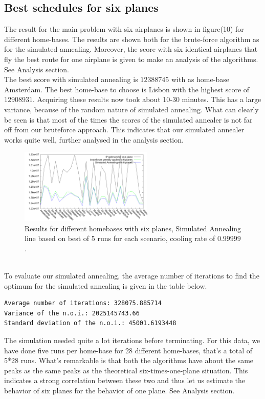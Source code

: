 \documentclass[journal]{IEEEtran}
\begin{document}
\subsection{Best schedules for six planes}
The result for the main problem with six airplanes is shown in figure(10) for different home-bases. The results are shown both for the brute-force algorithm as for the simulated annealing. Moreover, the score with six identical airplanes that fly the best route for one airplane is given to make an analysis of the algorithms. See Analysis section. 
\\
The best score with simulated annealing is $\num{12388745}$ with as home-base Amsterdam. The best home-base to choose is Lisbon with the highest score of $\num{12908931}$.  Acquiring these results now took about 10-30 minutes. This has a large variance, because of the random nature of simulated annealing.  What can clearly be seen is that most of the times the scores of the simulated annealer is not far off from our bruteforce approach. This indicates that our simulated annealer works quite well, further analysed in the analysis section.
\\
\begin{figure}[!h]
\centering
\includegraphics[width=2.5in]{different_homebases}
\caption{Results for different homebases with six planes, Simulated Annealing line based on best of 5 runs for each scenario, cooling rate of $0.99999$.}
\label{fig:different_homebase_six_planes}
\end{figure}
\\
To evaluate our simulated annealing, the average number of iterations to find the optimum for the simulated annealing is given in the table below. 
\begin{lstlisting}
Average number of iterations: 328075.885714
Variance of the n.o.i.: 2025145743.66
Standard deviation of the n.o.i.: 45001.6193448
\end{lstlisting}
The simulation needed quite a lot iterations before terminating. For this data, we have done five runs per home-base for 28 different home-bases, that's a total of 5*28 runs. What's remarkable is that both the algorithms have about the same peaks as the same peaks as the theoretical six-times-one-plane situation.  This indicates a strong correlation between these two and thus let us estimate the behavior of six planes for the behavior of one plane. See Analysis section. 
\\
\end{document}
